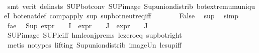 \begin{isabellebody}
\ \ \ \ \ \ \isamarkupfalse%
\ {\isacharparenleft}{\kern0pt}smt\ {\isacharparenleft}{\kern0pt}verit{\isacharcomma}{\kern0pt}\ del{\isacharunderscore}{\kern0pt}insts{\isacharparenright}{\kern0pt}\ SUP{\isacharunderscore}{\kern0pt}bot{\isacharunderscore}{\kern0pt}conv{\isacharparenleft}{\kern0pt}{}{\isacharparenright}{\kern0pt}\ SUP{\isacharunderscore}{\kern0pt}image\ Sup{\isacharunderscore}{\kern0pt}union{\isacharunderscore}{\kern0pt}distrib\ bot{\isachardot}{\kern0pt}extremum{\isacharunderscore}{\kern0pt}uniqueI\ bot{\isacharunderscore}{\kern0pt}enat{\isacharunderscore}{\kern0pt}def\ comp{\isacharunderscore}{\kern0pt}apply\ sup\ sup{\isacharunderscore}{\kern0pt}bot{\isachardot}{\kern0pt}neutr{\isacharunderscore}{\kern0pt}eq{\isacharunderscore}{\kern0pt}iff{\isacharparenright}{\kern0pt}\isanewline
\ \ \ \ \isamarkupfalse%
\ \isamarkupfalse%
\ False\ \isamarkupfalse%
\ sup\ \isamarkupfalse%
\ simp\isanewline
\ \ \isamarkupfalse%
\isanewline
\ \ \isamarkupfalse%
\ fa{\isacharunderscore}{\kern0pt}e{}\ \isamarkupfalse%
\ {\isachardoublequoteopen}{\isacharparenleft}{\kern0pt}Sup\ {\isacharparenleft}{\kern0pt}{\isacharparenleft}{\kern0pt}expr{\isacharunderscore}{\kern0pt}{}\ {\isasymcirc}\ {\isasymPhi}{\isacharparenright}{\kern0pt}\ {\isacharbackquote}{\kern0pt}\ I\ {\isasymunion}\ {\isacharparenleft}{\kern0pt}expr{\isacharunderscore}{\kern0pt}{}\ {\isasymcirc}\ {\isasymPhi}{\isacharparenright}{\kern0pt}\ {\isacharbackquote}{\kern0pt}\ J\ {\isasymunion}\ {\isacharparenleft}{\kern0pt}expr{\isacharunderscore}{\kern0pt}{}\ {\isasymcirc}\ {\isasymPhi}{\isacharparenright}{\kern0pt}\ {\isacharbackquote}{\kern0pt}\ J{\isacharparenright}{\kern0pt}{\isacharparenright}{\kern0pt}\ {\isasymle}\ {}{\isachardoublequoteclose}\isanewline
\ \ \ \ \isamarkupfalse%
\ SUP{\isacharunderscore}{\kern0pt}image\ SUP{\isacharunderscore}{\kern0pt}le{\isacharunderscore}{\kern0pt}iff\ hml{\isacharunderscore}{\kern0pt}conj{\isachardot}{\kern0pt}prems\ le{\isacharunderscore}{\kern0pt}zero{\isacharunderscore}{\kern0pt}eq\ sup{\isacharunderscore}{\kern0pt}bot{\isacharunderscore}{\kern0pt}right\isanewline
\ \ \ \ \isamarkupfalse%
\ {\isacharparenleft}{\kern0pt}metis\ {\isacharparenleft}{\kern0pt}no{\isacharunderscore}{\kern0pt}types{\isacharcomma}{\kern0pt}\ lifting{\isacharparenright}{\kern0pt}\ Sup{\isacharunderscore}{\kern0pt}union{\isacharunderscore}{\kern0pt}distrib\ image{\isacharunderscore}{\kern0pt}Un\ le{\isacharunderscore}{\kern0pt}sup{\isacharunderscore}{\kern0pt}iff{\isacharparenright}{\kern0pt}\isanewline

\end{isabellebody}
